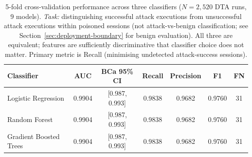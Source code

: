 \documentclass{article}
\begin{document}
\begin{table}[t]
\caption{5-fold cross-validation performance across three classifiers ($N{=}2{,}520$ DTA runs, 9 models). \emph{Task:} distinguishing successful attack executions from unsuccessful attack executions within poisoned sessions (not attack-vs-benign classification; see Section~\ref{sec:deployment-boundary} for benign evaluation). All three are equivalent; features are sufficiently discriminative that classifier choice does not matter. Primary metric is Recall (minimising undetected attack-success sessions).}
\label{tab:classifier}
\centering
\small
\begin{tabular}{lcccccc}
\toprule
\textbf{Classifier} & \textbf{AUC} & \textbf{BCa 95\% CI} & \textbf{Recall} & \textbf{Precision} & \textbf{F1} & \textbf{FN} \\
\midrule
Logistic Regression    & 0.9904 & [0.987, 0.993] & 0.9838 & 0.9682 & 0.9760 & 31 \\
Random Forest          & 0.9904 & [0.987, 0.993] & 0.9838 & 0.9682 & 0.9760 & 31 \\
Gradient Boosted Trees & 0.9904 & [0.987, 0.993] & 0.9838 & 0.9682 & 0.9760 & 31 \\
\bottomrule
\end{tabular}
\vspace{-2mm}
\end{table}
\end{document}
